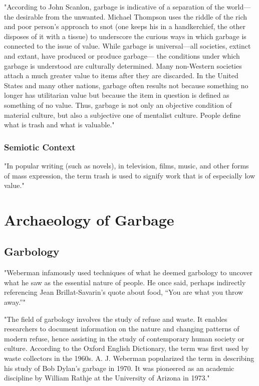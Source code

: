 \documentclass[12pt]{article}
\begin{document}
"According to John Scanlon, garbage is indicative of a separation of the world---the desirable from the unwanted. Michael Thompson uses the riddle of the rich and poor person’s approach to snot (one keeps his in a handkerchief, the other disposes of it with a tissue) to underscore the curious ways in which garbage is connected to the issue of value. While garbage is universal---all societies, extinct and extant, have produced or produce garbage--- the conditions under which garbage is understood are culturally determined. Many non-Western societies attach a much greater value to items after they are discarded. In the United States and many other nations, garbage often results not because something no longer has utilitarian value but because the item in question is defined as something of no value. Thus, garbage is not only an objective condition of material culture, but also a subjective one of mentalist culture. People define what is trash and what is valuable." \cite{lukas2012garbage}

%
\subsubsection{Semiotic Context}
"In popular writing (such as novels), in television, films, music, and other forms of mass expression, the term trash is used to signify work that is of especially low value." \cite{lukas2012garbage}

\section{Archaeology of Garbage}

\subsection{Garbology}
"Weberman infamously used techniques of what he deemed garbology to uncover what he saw as the essential nature of people. He once said, perhaps indirectly referencing Jean Brillat-Savarin’s quote about food, “You are what you throw away.”" \cite{lukas2012garbage}

"The field of garbology involves the study of refuse and waste. It enables researchers to document information on the nature and changing patterns of modern refuse, hence assisting in the study of contemporary human society or culture. According to the Oxford English Dictionary, the term was first used by waste collectors in the 1960s. A. J. Weberman popularized the term in describing his study of Bob Dylan’s garbage in 1970. It was pioneered as an academic discipline by William Rathje at the University of Arizona in 1973."
\end{document}
